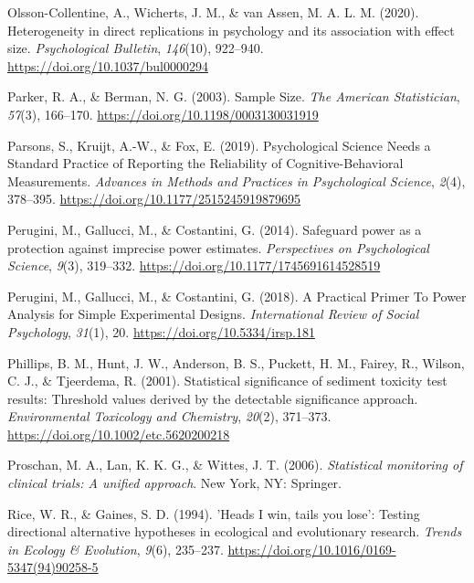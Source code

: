 \documentclass[
  english,
  ,jou, a4paper,floatsintext]{apa6}
\newlength{\cslhangindent}
\newenvironment{cslreferences}%
  {\setlength{\parindent}{0pt}%
  \everypar{\setlength{\hangindent}{\cslhangindent}}\ignorespaces}%
  {\par}
\begin{document}
\begin{cslreferences}
\leavevmode\hypertarget{ref-olsson-collentine_heterogeneity_2020}{}%
Olsson-Collentine, A., Wicherts, J. M., \& van Assen, M. A. L. M. (2020). Heterogeneity in direct replications in psychology and its association with effect size. \emph{Psychological Bulletin}, \emph{146}(10), 922--940. \url{https://doi.org/10.1037/bul0000294}

\leavevmode\hypertarget{ref-parker_sample_2003}{}%
Parker, R. A., \& Berman, N. G. (2003). Sample Size. \emph{The American Statistician}, \emph{57}(3), 166--170. \url{https://doi.org/10.1198/0003130031919}

\leavevmode\hypertarget{ref-parsons_psychological_2019}{}%
Parsons, S., Kruijt, A.-W., \& Fox, E. (2019). Psychological Science Needs a Standard Practice of Reporting the Reliability of Cognitive-Behavioral Measurements. \emph{Advances in Methods and Practices in Psychological Science}, \emph{2}(4), 378--395. \url{https://doi.org/10.1177/2515245919879695}

\leavevmode\hypertarget{ref-perugini_safeguard_2014}{}%
Perugini, M., Gallucci, M., \& Costantini, G. (2014). Safeguard power as a protection against imprecise power estimates. \emph{Perspectives on Psychological Science}, \emph{9}(3), 319--332. \url{https://doi.org/10.1177/1745691614528519}

\leavevmode\hypertarget{ref-perugini_practical_2018}{}%
Perugini, M., Gallucci, M., \& Costantini, G. (2018). A Practical Primer To Power Analysis for Simple Experimental Designs. \emph{International Review of Social Psychology}, \emph{31}(1), 20. \url{https://doi.org/10.5334/irsp.181}

\leavevmode\hypertarget{ref-phillips_statistical_2001}{}%
Phillips, B. M., Hunt, J. W., Anderson, B. S., Puckett, H. M., Fairey, R., Wilson, C. J., \& Tjeerdema, R. (2001). Statistical significance of sediment toxicity test results: Threshold values derived by the detectable significance approach. \emph{Environmental Toxicology and Chemistry}, \emph{20}(2), 371--373. \url{https://doi.org/10.1002/etc.5620200218}

\leavevmode\hypertarget{ref-proschan_statistical_2006}{}%
Proschan, M. A., Lan, K. K. G., \& Wittes, J. T. (2006). \emph{Statistical monitoring of clinical trials: A unified approach}. New York, NY: Springer.

\leavevmode\hypertarget{ref-rice_heads_1994}{}%
Rice, W. R., \& Gaines, S. D. (1994). 'Heads I win, tails you lose': Testing directional alternative hypotheses in ecological and evolutionary research. \emph{Trends in Ecology \& Evolution}, \emph{9}(6), 235--237. \url{https://doi.org/10.1016/0169-5347(94)90258-5}


\end{cslreferences}
\end{document}
